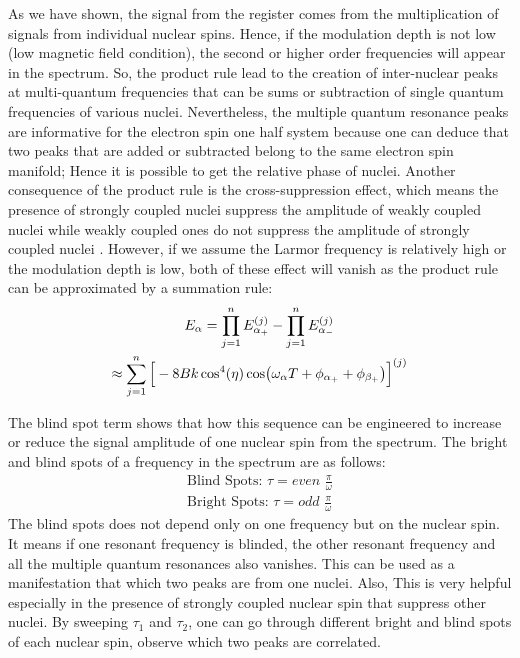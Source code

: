 \documentclass[%
 reprint,
superscriptaddress,
 amsmath,amssymb,
 aps,
]{revtex4-2}
\begin{document}
As we have shown, the signal from the register comes from the multiplication of signals from individual nuclear spins. Hence, if the modulation depth is not low (low magnetic field condition), the second or higher order frequencies will appear in the spectrum. So, the product rule lead to the creation of inter-nuclear peaks at multi-quantum frequencies that can be sums or subtraction of single quantum frequencies of various nuclei. Nevertheless, the multiple quantum resonance peaks are informative for the electron spin one half system because one can deduce that two peaks that are added or subtracted belong to the same electron spin manifold; Hence it is possible to get the relative phase of nuclei. Another consequence of the product rule is the cross-suppression effect, which means the presence of strongly coupled nuclei suppress the amplitude of weakly coupled nuclei while weakly coupled ones do not suppress the amplitude of strongly coupled nuclei \cite{stoll2005peak}. However, if we assume the Larmor frequency is relatively high or the modulation depth is low, both of these effect will vanish as the product rule can be approximated by a summation rule:\\
\begin{gather}
	E_\alpha = \prod_{j=1}^n E_{\alpha_+}^{(j)} - \prod_{j=1}^n E_{\alpha_-}^{(j)}  \notag \\ 
	\approx \sum_{j=1}^n \Big[-8Bk\cos^4(\eta) \cos(\omega_\alpha T + \phi_{\alpha_+}+ \phi_{\beta_+}) \Big]^{(j)}
\end{gather}

The blind spot term shows that how this sequence can be engineered to increase or reduce the signal amplitude of one nuclear spin from the spectrum. The bright and blind spots of a frequency in the spectrum are as follows:
\begin{align}
	\text{Blind Spots:	} \tau = even \,\, \frac{\pi}{\omega}\\
	\text{Bright Spots:	} \tau = odd \,\, \frac{\pi}{\omega}
\end{align}
The blind spots does not depend only on one frequency but on the nuclear spin. It means if one resonant frequency is blinded, the other resonant frequency and all the multiple quantum resonances also vanishes. This can be used as a manifestation that which two peaks are from one nuclei. Also, This is very helpful especially in the presence of strongly coupled nuclear spin that suppress other nuclei. By sweeping $\tau_1$ and $\tau_2$, one can go through different bright and blind spots of each nuclear spin, observe which two peaks are correlated.



\end{document}
